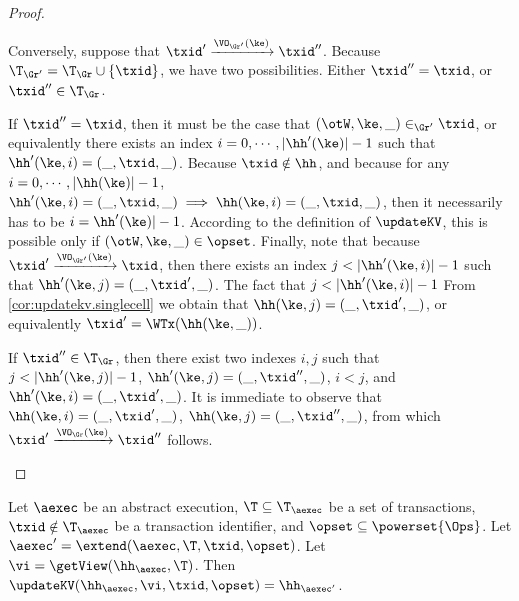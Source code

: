 \begin{proof}
\begin{enumerate}
Conversely, suppose that $\txid' \xrightarrow{\VO_{\Gr'}(\ke)} \txid''$. Because 
$\T_{\Gr'} = \T_{\Gr} \cup \{ \txid \}$, we have two possibilities. Either $\txid'' = \txid$, 
or $\txid'' \in \T_{\Gr}$. 

If $\txid'' = \txid$, then it must be the case that $(\otW, \ke, \_) \in_{\Gr'} \txid$, 
or equivalently there exists an index $i=0,\cdots, \lvert \hh'(\ke) \rvert -1 $ such that 
$\hh'(\ke, i) = (\_, \txid, \_)$. Because $\txid \notin \hh$, and because for any 
$i = 0, \cdots, \lvert \hh(\ke) \rvert - 1$, $\hh'(\ke, i) = (\_, \txid, \_) \implies 
\hh(\ke, i) = (\_, \txid, \_)$, then it necessarily has to be $i = \hh'(\ke) \rvert - 1$. 
According to the definition of $\updateKV$, this is possible only if $(\otW,\ke, \_) \in \opset$. 
Finally, note that because $\txid' \xrightarrow{\VO_{\Gr'}(\ke)} \txid$, then 
there exists an index $j < \lvert \hh'(\ke, i) \rvert - 1$ such that 
$\hh'(\ke, j) = (\_, \txid' ,\_)$. The fact that $j < \lvert \hh'(\ke, i) \rvert - 1$ 
From \cref{cor:updatekv.singlecell} we obtain that $\hh(\ke, j) = (\_, \txid', \_)$, 
or equivalently $\txid' = \WTx(\hh(\ke, \_))$. 

If $\txid'' \in \T_{\Gr}$, then there exist two indexes $i,j$ such that 
$j < \lvert \hh'(\ke, j) \rvert - 1$, $\hh'(\ke, j) = (\_, \txid'', \_)$, 
$i < j$, and $\hh'(\ke, i) = (\_, \txid', \_)$. It is immediate to observe 
that $\hh(\ke, i) = (\_, \txid', \_)$, $\hh(\ke, j) = (\_, \txid'', \_)$, 
from which $\txid' \xrightarrow{\VO_{\Gr}(\ke)} \txid''$ follows. 

\end{enumerate}
\end{proof}

\begin{proposition}
\label{prop:extend.update.sameop}
Let $\aexec$ be an abstract execution, $\T \subseteq \T_{\aexec}$ be a set of transactions, 
$\txid \notin \T_{\aexec}$ be a transaction identifier, and $\opset \subseteq \powerset{\Ops}$. 
Let $\aexec' = \extend(\aexec, \T, \txid, \opset)$. 
Let $\vi = \getView(\hh_{\aexec}, \T)$. 
Then $\updateKV(\hh_{\aexec}, \vi, \txid, \opset) = \hh_{\aexec'}$.
\end{proposition}


